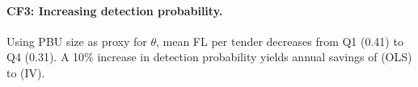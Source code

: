 \paragraph{CF3: Increasing detection probability.}
Using PBU size as proxy for $\theta$, mean FL per tender decreases
from Q1 (0.41) to Q4 (0.31). A 10\% increase in detection probability
yields annual savings of \valCounterStartCost (OLS) to \valCounterMinImp (IV).


